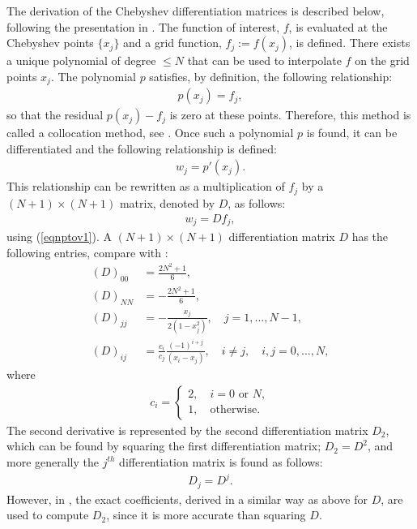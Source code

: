 The derivation of the Chebyshev differentiation matrices is described below, following the presentation in \cite{bibTrefethen}.
The function of interest, $f$, is evaluated at the Chebyshev points $\{x_j\}$ and a grid function, $f_j := f(x_j)$, is defined.
There exists a unique polynomial of degree $\leq N$ that can be used to interpolate $f$ on the grid points $x_j$. The polynomial $p$ satisfies, by definition, the following relationship:
\begin{align}\label{eqnptov1}
p(x_j)=f_j,
\end{align}
so that the residual $p(x_j) -f_j$ is zero at these points. Therefore, this method is called a collocation method, see \cite{Boyd1}. 
Once such a polynomial $p$ is found, it can be differentiated and the following relationship is defined:
\begin{align*}
w_j = p'(x_j).
\end{align*} 	
This relationship can be rewritten as a multiplication of $f_j$ by a $(N+1) \times (N+1)$ matrix, denoted by $D$, as follows:
\begin{align*}
w_j= D f_j,
\end{align*}
using (\ref{eqnptov1}).
A $(N+1) \times (N+1)$ differentiation matrix $D$ has the following entries, compare with \cite{bibTrefethen}:
\begin{align*}
(D)_{00}&= \frac{2N^2 +1}{6},\\
(D)_{NN}&= -\frac{2N^2 +1}{6},\\
(D)_{jj}&= -\frac{x_j}{2(1-x_j^2)}, \quad j=1,...,N-1,\\
(D)_{ij}&= \frac{c_i}{c_j} \frac{(-1)^{i+j}}{(x_i-x_j)}, \quad i \neq j, \quad i,j=0,...,N,
\end{align*} 	
where 
\begin{align*}
c_i =\left\{\begin{array}{l} 2, \quad i=0 \text{   or   }N, \\1, \quad \text{otherwise.}\end{array}\right.
\end{align*}	
The second derivative is represented by the second differentiation matrix $D_2$, which can be found by squaring the first differentiation matrix; $D_2=D^2$, and more generally the $j^{th}$ differentiation matrix is found as follows:
\begin{align*}
D_j=D^j.
\end{align*}
However, in \cite{GoddardPseudospectralCode1}, the exact coefficients, derived in a similar way as above for $D$, are used to compute $D_2$, since it is more accurate than squaring $D$.

